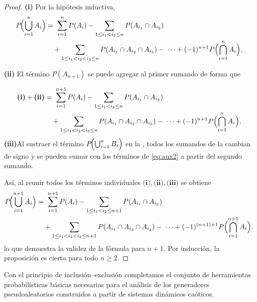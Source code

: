 \documentclass[../Main.tex]{subfiles}
\begin{document}
\begin{proof}
\noindent\textbf{(i)}
Por la hipótesis inductiva,  
\begin{equation}
\begin{aligned}
P\!\Bigl(\bigcup_{i=1}^{n} A_i\Bigr)
  &=\;
    \sum_{i=1}^{n} P(A_i)
    - \sum_{1\le i_1<i_2\le n} P(A_{i_1}\cap A_{i_2}) \\
  &\quad
    + \sum_{1\le i_1<i_2<i_3\le n} P(A_{i_1}\cap A_{i_2}\cap A_{i_3})
    -\; \cdots
    + (-1)^{n+1} P\Bigl(\bigcap_{i=1}^{n} A_i\Bigr).
\end{aligned}
\end{equation}

\noindent\textbf{(ii)} El término \(P(A_{n+1})\) se puede agregar al primer sumando de forma que

\begin{equation}
\begin{aligned}
\textbf{(i)}+\textbf{(ii)}
  &=\;
    \sum_{i=1}^{n+1} P(A_i)
    - \sum_{1\le i_1<i_2\le n} P(A_{i_1}\cap A_{i_2}) \\
  &\quad
    + \sum_{1\le i_1<i_2<i_3\le n} P(A_{i_1}\cap A_{i_2}\cap A_{i_3})
    -\; \cdots
    + (-1)^{n+1} P\Bigl(\bigcap_{i=1}^{n} A_i\Bigr).
\end{aligned}
\label{eq:aux2}
\end{equation}
\noindent\textbf{(iii)}Al sustraer el término \(P\!\Bigl(\bigcup_{i=1}^{n}B_i\Bigr)\) en la , todos los sumandos de la  cambian de signo y se pueden sumar con los términos de \ref{eq:aux2} a partir del segundo sumando.

Así, al reunir todos los términos individuales $\textbf{(i)},\textbf{(ii)},\textbf{(iii)}$ se obtiene
\begin{equation}
\begin{aligned}
P\!\Bigl(\bigcup_{i=1}^{n+1} A_i\Bigr)
  &=\;
    \sum_{i=1}^{n+1} P(A_i)
    - \sum_{1\le i_1<i_2\le n+1} P(A_{i_1}\cap A_{i_2}) \\
  &\quad
    + \sum_{1\le i_1<i_2<i_3\le n+1} P(A_{i_1}\cap A_{i_2}\cap A_{i_3})
    -\; \cdots
    + (-1)^{(n+1)+1} P\Bigl(\bigcap_{i=1}^{n+1} A_i\Bigr).
\end{aligned}
\end{equation}
lo que demuestra la validez de la fórmula para \(n+1\).
Por inducción, la proposición es cierta para todo \(n\ge 2\).
\end{proof}

Con el principio de inclusión–exclusión completamos el conjunto de
herramientas probabilísticas básicas necesarias para el análisis de los generadores pseudoaleatorios construidos a partir de
sistemas dinámicos caóticos.
\end{document}
